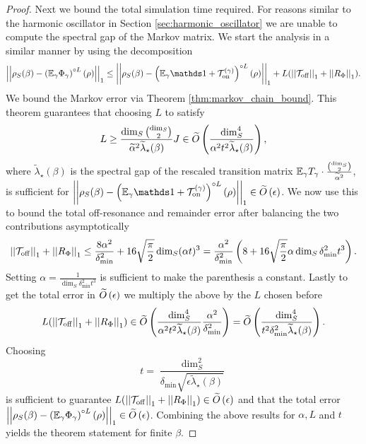 \begin{proof}
Next we bound the total simulation time required. For reasons similar to the harmonic oscillator in Section \ref{sec:harmonic_oscillator} we are unable to compute the spectral gap of the Markov matrix. We start the analysis in a similar manner by using the decomposition
\begin{equation}
    \norm{\rho_S(\beta) - \left(\EE_\gamma \Phi_\gamma\right)^{\circ L}(\rho)}_1 \le \norm{\rho_S(\beta) - \left(\EE_\gamma \identity + \TT_{\on}^{(\gamma)}\right)^{\circ L}(\rho)}_1 + L(\norm{\TT_{\off}}_1 + \norm{R_{\Phi}}_1 ).
\end{equation}
We bound the Markov error via Theorem \ref{thm:markov_chain_bound}. This theorem guarantees that choosing $L$ to satisfy
\begin{align}
    L \ge \frac{\dim_S \binom{\dim_S}{2}}{\widetilde{\alpha}^2 \widetilde{\lambda}_\star(\beta)} J \in \widetilde{O} \left( \frac{\dim_S^4}{\alpha^2 t^2 \widetilde{\lambda}_\star(\beta)} \right),
\end{align}
where $\widetilde{\lambda}_\star(\beta)$ is the spectral gap of the rescaled transition matrix $\mathbb{E}_\gamma T_\gamma \cdot \frac{\binom{\dim_S}{2}}{\widetilde{\alpha}^2}$, is sufficient for $\norm{\rho_S(\beta) - \left(\EE_\gamma \identity + \TT_{\on}^{(\gamma)}\right)^{\circ L}(\rho)}_1 \in \bigotilde{\epsilon}$. We now use this to bound the total off-resonance and remainder error after balancing the two contributions asymptotically
\begin{align}
    \left| \left| \mathcal{T}_{\rm off} \right| \right|_1 + \left| \left| R_{\Phi} \right| \right|_1 \le \frac{8\alpha^2}{\delta_{\min}^2} + 16 \sqrt{\frac{\pi}{2}} \dim_S (\alpha t)^3 = \frac{\alpha^2}{\delta_{\min}^2} \left( 8+ 16 \sqrt{\frac{\pi}{2}}  \alpha \dim_S \delta_{\min}^2 t^3\right).
\end{align}
Setting $\alpha = \frac{1}{\dim_S \delta_{\min}^2 t^3}$ is sufficient to make the parenthesis a constant. Lastly to get the total error in $\widetilde{O} \left( \epsilon \right)$ we multiply the above by the $L$ chosen before
\begin{align}
    L (\left| \left| \mathcal{T}_{\rm off} \right| \right|_1 + \left| \left| R_{\Phi} \right| \right|_1) \in \widetilde{O} \left( \frac{\dim_S^4}{\alpha^2 t^2 \widetilde{\lambda}_\star(\beta)} \frac{\alpha^2}{\delta_{\min}^2} \right) = \widetilde{O} \left( \frac{\dim_S^4}{ t^2 \delta_{\min}^2 \widetilde{\lambda}_\star(\beta)}  \right).
\end{align}
Choosing
\begin{equation}
    t = \frac{\dim_S^2}{\delta_{\min} \sqrt{\epsilon \widetilde{\lambda}_\star(\beta)}} 
\end{equation}
is sufficient to guarantee $L (\left| \left| \mathcal{T}_{\rm off} \right| \right|_1 + \left| \left| R_{\Phi} \right| \right|_1) \in \widetilde{O} \left( \epsilon \right)$ and that the total error $\left| \left| \rho_S(\beta) - \left( \mathbb{E}_\gamma \Phi_\gamma \right)^{\circ L}(\rho) \right| \right|_1 \in \widetilde{O} \left( \epsilon \right)$. Combining the above results for $\alpha, L$ and $t$ yields the theorem statement for finite $\beta$. 


\end{proof}
